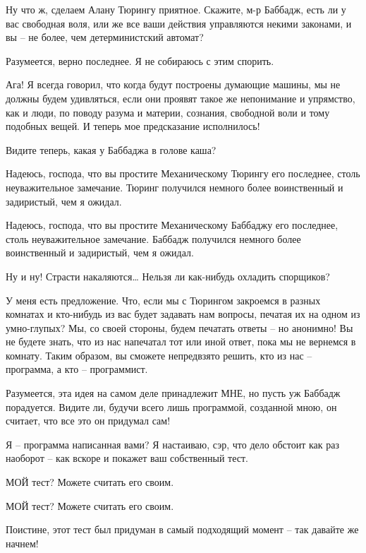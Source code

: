 \documentclass[../main.tex]{subfiles}
\begin{document}
\begin{dialogue}
 Ну что ж, сделаем Алану Тюрингу приятное. Скажите, м-р Баббадж, есть ли у вас свободная воля, или же все ваши действия управляются некими законами, и вы \--- не более, чем детерминистский автомат?

 Разумеется, верно последнее. Я не собираюсь с этим спорить.

 Ага! Я всегда говорил, что когда будут построены думающие машины, мы не должны будем удивляться, если они проявят такое же непонимание и упрямство, как и люди, по поводу разума и материи, сознания, свободной воли и тому подобных вещей. И теперь мое предсказание исполнилось!

 Видите теперь, какая у Баббаджа в голове каша?

 Надеюсь, господа, что вы простите Механическому Тюрингу его последнее, столь неуважительное замечание. Тюринг получился немного более воинственный и задиристый, чем я ожидал.

 Надеюсь, господа, что вы простите Механическому Баббаджу его последнее, столь неуважительное замечание. Баббадж получился немного более воинственный и задиристый, чем я ожидал.

 Ну и ну! Страсти накаляются\ldots{} Нельзя ли как-нибудь охладить спорщиков?

 У меня есть предложение. Что, если мы с Тюрингом закроемся в разных комнатах и кто-нибудь из вас будет задавать нам вопросы, печатая их на одном из умно-глупых? Мы, со своей стороны, будем печатать ответы \--- но анонимно! Вы не будете знать, что из нас напечатал тот или иной ответ, пока мы не вернемся в комнату. Таким образом, вы сможете непредвзято решить, кто из нас \--- программа, а кто \--- программист.

 Разумеется, эта идея на самом деле принадлежит МНЕ, но пусть уж Баббадж порадуется. Видите ли, будучи всего лишь программой, созданной мною, он считает, что все это он придумал сам!

 Я \--- программа написанная вами? Я настаиваю, сэр, что дело обстоит как раз наоборот \--- как вскоре и покажет ваш собственный тест.

 МОЙ тест? Можете считать его своим.

 МОЙ тест? Можете считать его своим.

 Поистине, этот тест был придуман в самый подходящий момент \--- так давайте же начнем!


\end{dialogue}
\end{document}
